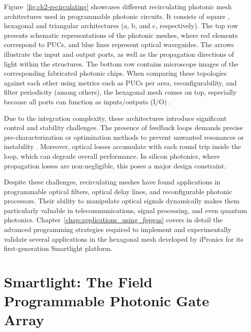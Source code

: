 Figure~\ref{fig:ch2-recirculating} showcases different recirculating photonic mesh architectures used in programmable photonic circuits.
It consists of square \cite{zhuang_programmable_2015}, hexagonal \cite{perez_multipurpose_2017} and triangular \cite{perez-lopez_integrated_2019} architectures (a, b, and c, respectively).
The top row presents schematic representations of the photonic meshes, where red elements correspond to PUCs, and blue lines represent optical waveguides.
The arrows illustrate the input and output ports, as well as the propagation directions of light within the structures.
The bottom row contains microscope images of the corresponding fabricated photonic chips.
When comparing these topologies \cite{perez_reconfigurable_2016-1,capmany_programmable_2020} against each other using metrics such as PUCs per area, reconfigurability, and filter periodicity (among others), the hexagonal mesh comes on top, especially because all ports can function as inputs/outputs (I/O) \cite{bogaerts_programmable_2020}.

Due to the integration complexity, these architectures introduce significant control and stability challenges.
The presence of feedback loops demands precise pre-characterization or optimization methods to prevent unwanted resonances or instability \cite{perez-lopez_multipurpose_2020,perez-lopez_programmable_2020}.
Moreover, optical losses accumulate with each round trip inside the loop, which can degrade overall performance.
In silicon photonics, where propagation losses are non-negligible, this poses a major design constraint.

Despite these challenges, recirculating meshes have found applications in programmable optical filters, optical delay lines, and reconfigurable photonic processors.
Their ability to manipulate optical signals dynamically makes them particularly valuable in telecommunications, signal processing, and even quantum photonics.
Chapter~\ref{chap:applications_using_fppgas} covers in detail the advanced programming strategies required to implement and experimentally validate several applications in the hexagonal mesh developed by iPronics for its first-generation Smartlight platform.

\section{Smartlight: The Field Programmable Photonic Gate Array}\label{sec:smartlight_fppga}

